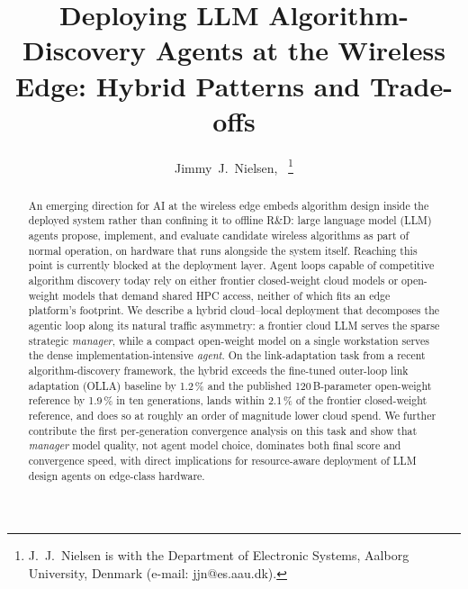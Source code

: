 \documentclass[journal]{IEEEtran}
\begin{document}
\title{Deploying LLM Algorithm-Discovery Agents at the Wireless Edge: Hybrid Patterns and Trade-offs}

\author{
Jimmy~J.~Nielsen,~
\thanks{J.~J.~Nielsen is with the Department of Electronic Systems, Aalborg University, Denmark (e-mail: jjn@es.aau.dk).}
}


\maketitle

\begin{abstract}
An emerging direction for AI at the wireless edge embeds algorithm design inside the deployed system rather than confining it to offline R\&D: large language model (LLM) agents propose, implement, and evaluate candidate wireless algorithms as part of normal operation, on hardware that runs alongside the system itself. Reaching this point is currently blocked at the deployment layer. Agent loops capable of competitive algorithm discovery today rely on either frontier closed-weight cloud models or open-weight models that demand shared HPC access, neither of which fits an edge platform's footprint. We describe a hybrid cloud--local deployment that decomposes the agentic loop along its natural traffic asymmetry: a frontier cloud LLM serves the sparse strategic \emph{manager}, while a compact open-weight model on a single workstation serves the dense implementation-intensive \emph{agent}. On the link-adaptation task from a recent algorithm-discovery framework, the hybrid exceeds the fine-tuned outer-loop link adaptation (OLLA) baseline by 1.2\,\% and the published 120\,B-parameter open-weight reference by 1.9\,\% in ten generations, lands within 2.1\,\% of the frontier closed-weight reference, and does so at roughly an order of magnitude lower cloud spend. We further contribute the first per-generation convergence analysis on this task and show that \emph{manager} model quality, not agent model choice, dominates both final score and convergence speed, with direct implications for resource-aware deployment of LLM design agents on edge-class hardware.
\end{abstract}
\end{document}

